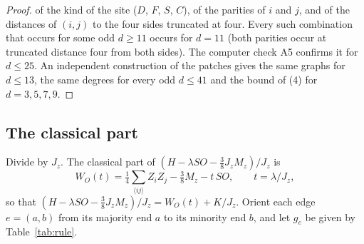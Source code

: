 \documentclass[aps,prx,onecolumn,10pt,nofootinbib,longbibliography,floatfix]{revtex4-2}
\theoremstyle{remark}
\newcommand{\Jz}{J_z}
\begin{document}
\begin{proof}
of the kind of the site ($D$, $F$, $S$, $C$), of the parities of $i$ and $j$, and of the distances of $(i,j)$ to the
four sides truncated at four. Every such combination that occurs for some odd $d\ge11$ occurs for $d=11$ (both %
parities occur at truncated distance four from both sides). The computer check A5 confirms it for $d\le25$. %
An independent construction of the patches gives the same graphs for $d\le13$, the same degrees for every odd %
$d\le41$ and the bound of (4) for $d=3,5,7,9$. %
\end{proof}

\subsection{The classical part}

Divide by $\Jz$. The classical part of $(H-\lambda SO-\frac38\Jz M_z)/\Jz$ is
\begin{equation}
W_O(t)=\tfrac14\sum_{\langle ij\rangle}Z_iZ_j-\tfrac38M_z-t\,SO ,\qquad t=\lambda/\Jz , %
\label{eq:W}
\end{equation}
so that $(H-\lambda SO-\frac38\Jz M_z)/\Jz=W_O(t)+K/\Jz$. Orient each edge $e=(a,b)$ from its majority end $a$ to its
minority end $b$, and let $g_e$ be given by Table~\ref{tab:rule}.
\end{document}
